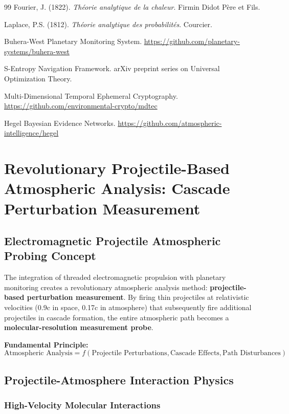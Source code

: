 \documentclass[12pt,a4paper]{article}
\begin{document}
\begin{thebibliography}{99}
Fourier, J. (1822). \textit{Théorie analytique de la chaleur}. Firmin Didot Père et Fils.

Laplace, P.S. (1812). \textit{Théorie analytique des probabilités}. Courcier.

Buhera-West Planetary Monitoring System. \url{https://github.com/planetary-systems/buhera-west}

S-Entropy Navigation Framework. arXiv preprint series on Universal Optimization Theory.

Multi-Dimensional Temporal Ephemeral Cryptography. \url{https://github.com/environmental-crypto/mdtec}

Hegel Bayesian Evidence Networks. \url{https://github.com/atmospheric-intelligence/hegel}



\section{Revolutionary Projectile-Based Atmospheric Analysis: Cascade Perturbation Measurement}

\subsection{Electromagnetic Projectile Atmospheric Probing Concept}

The integration of threaded electromagnetic propulsion \cite{goromigo_framework} with planetary monitoring creates a revolutionary atmospheric analysis method: \textbf{projectile-based perturbation measurement}. By firing thin projectiles at relativistic velocities (0.9c in space, 0.17c in atmosphere) that subsequently fire additional projectiles in cascade formation, the entire atmospheric path becomes a \textbf{molecular-resolution measurement probe}.

\textbf{Fundamental Principle:}
\begin{equation}
\text{Atmospheric Analysis} = f(\text{Projectile Perturbations}, \text{Cascade Effects}, \text{Path Disturbances})
\end{equation}

\subsection{Projectile-Atmosphere Interaction Physics}

\subsubsection{High-Velocity Molecular Interactions}


\end{thebibliography}
\end{document}
